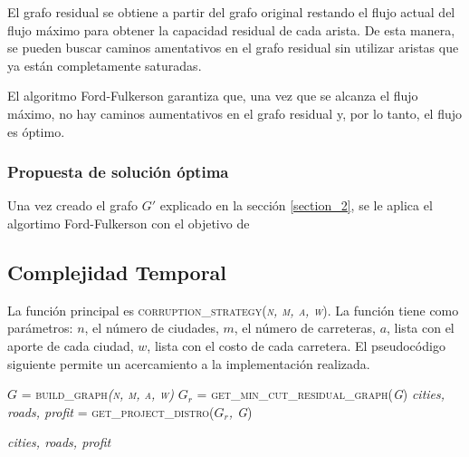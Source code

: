 \documentclass[10pt]{article} %
\begin{document}
	El grafo residual se obtiene a partir del grafo original restando el flujo actual del flujo máximo para obtener la capacidad residual de cada arista. De esta manera, se pueden buscar caminos amentativos en el grafo residual sin utilizar aristas que ya están completamente saturadas.
	
	El algoritmo Ford-Fulkerson garantiza que, una vez que se alcanza el flujo máximo, no hay caminos aumentativos en el grafo residual y, por lo tanto, el flujo es óptimo.
	
	\subsubsection{Propuesta de soluci\'on \'optima}
	
	Una vez creado el grafo $G'$ explicado en la secci\'on \ref{section_2}, se le aplica el algortimo Ford-Fulkerson con el objetivo de 
	
	

	
	
	
	
	
	
	
	
	
	\subsection{Complejidad Temporal}
	
	La funci\'on principal es \textsc{corruption\_strategy(\textit{n, m, a, w})}. La funci\'on tiene como par\'ametros: $n$, el n\'umero de ciudades, $m$, el n\'umero de carreteras, $a$, lista con el aporte de cada ciudad, $w$, lista con el costo de cada carretera. El pseudoc\'odigo siguiente permite un acercamiento a la implementaci\'on realizada.
	
	\begin{algorithmic}[1]
		
		\State $G$ = \textsc{build\_graph\textit{(n, m, a, w)}}
		\State $G_r$ =\textsc{ get\_min\_cut\_residual\_graph(\textit{G})}
		\State \textit{cities, roads, profit} = \textsc{get\_project\_distro(\textit{$G_r$, G})}
		
		\Return \textit{cities, roads, profit}
		\EndFunction
	\end{algorithmic}
\end{document}
